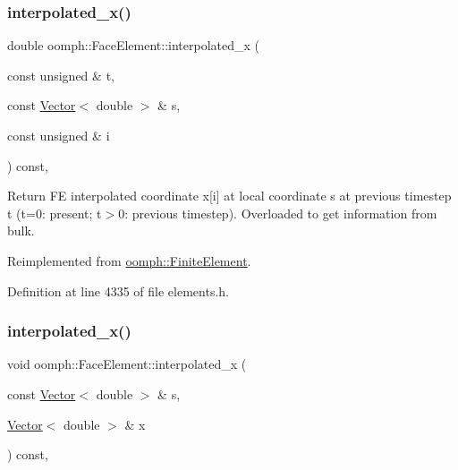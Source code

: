 \mbox{\label{classoomph_1_1FaceElement_ac923e43c8868ffe4c6e2284bb63013f0}} 
\subsubsection{\texorpdfstring{interpolated\+\_\+x()}{interpolated\_x()}\hspace{0.1cm}{\footnotesize\ttfamily [2/4]}}
{\footnotesize\ttfamily double oomph\+::\+Face\+Element\+::interpolated\+\_\+x (\begin{DoxyParamCaption}\item[{const unsigned \&}]{t,  }\item[{const \hyperlink{classoomph_1_1Vector}{Vector}$<$ double $>$ \&}]{s,  }\item[{const unsigned \&}]{i }\end{DoxyParamCaption}) const\hspace{0.3cm}{\ttfamily [inline]}, {\ttfamily [virtual]}}



Return FE interpolated coordinate x\mbox{[}i\mbox{]} at local coordinate s at previous timestep t (t=0\+: present; t$>$0\+: previous timestep). Overloaded to get information from bulk. 



Reimplemented from \hyperlink{classoomph_1_1FiniteElement_aba7e6f4acad38c5f9188238b256da4a3}{oomph\+::\+Finite\+Element}.



Definition at line 4335 of file elements.\+h.

\mbox{\label{classoomph_1_1FaceElement_a01b07e01c23777ed539a6b6d37f069ee}} 
\subsubsection{\texorpdfstring{interpolated\+\_\+x()}{interpolated\_x()}\hspace{0.1cm}{\footnotesize\ttfamily [3/4]}}
{\footnotesize\ttfamily void oomph\+::\+Face\+Element\+::interpolated\+\_\+x (\begin{DoxyParamCaption}\item[{const \hyperlink{classoomph_1_1Vector}{Vector}$<$ double $>$ \&}]{s,  }\item[{\hyperlink{classoomph_1_1Vector}{Vector}$<$ double $>$ \&}]{x }\end{DoxyParamCaption}) const\hspace{0.3cm}{\ttfamily [inline]}, {\ttfamily [virtual]}}



